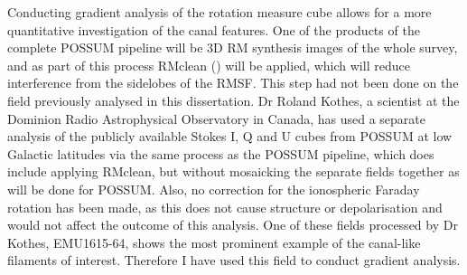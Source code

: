 Conducting gradient analysis of the rotation measure cube allows for a more quantitative investigation of the canal features. One of the products of the complete POSSUM pipeline will be 3D RM synthesis images of the whole survey, and as part of this process RMclean (\cite{Heald_2009}) will be applied, which will reduce interference from the sidelobes of the RMSF. This step had not been done on the field previously analysed in this dissertation. Dr Roland Kothes, a scientist at the Dominion Radio Astrophysical Observatory in Canada, has used a separate analysis of the publicly available Stokes I, Q and U cubes from POSSUM at low Galactic latitudes via the same process as the POSSUM pipeline, which does include applying RMclean, but without mosaicking the separate fields together as will be done for POSSUM. Also, no correction for the ionospheric Faraday rotation has been made, as this does not cause structure or depolarisation and would not affect the outcome of this analysis. One of these fields processed by Dr Kothes, EMU1615-64, shows the most prominent example of the canal-like filaments of interest. Therefore I have used this field to conduct gradient analysis. 

